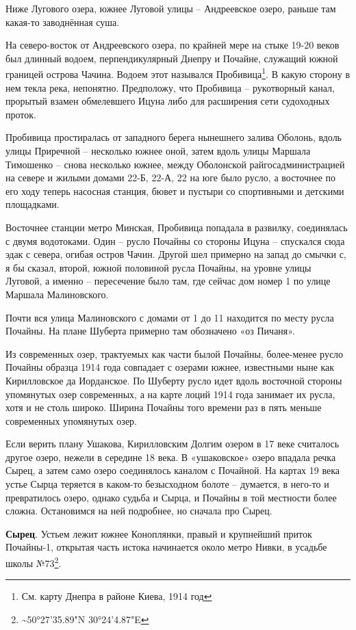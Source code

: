 Ниже Лугового озера, южнее Луговой улицы – 
Андреевское озеро, раньше там какая-то заводнённая суша. 

На северо-восток от Андреевского озера, по крайней мере на стыке 19-20 веков был длинный водоем, перпендикулярный Днепру и Почайне, служащий южной границей острова Чачина. Водоем этот назывался Пробивица\footnote{См. карту Днепра в районе Киева, 1914 год}. В какую сторону в нем текла река, непонятно. Предположу, что Пробивица – рукотворный канал, прорытый взамен обмелевшего Ицуна либо для расширения сети судоходных проток.

Пробивица простиралась от западного берега нынешнего залива Оболонь, вдоль улицы Приречной – несколько южнее оной, затем вдоль улицы Маршала Тимошенко – снова несколько южнее, между Оболонской райгосадминистрацией на севере и жилыми домами 22-Б, 22-А, 22 на юге было русло, а восточнее по его ходу теперь насосная станция, бювет и пустыри со спортивными и детскими площадками.

Восточнее станции метро Минская, Пробивица попадала в развилку, соединялась с двумя водотоками. Один – русло Почайны со стороны Ицуна – спускался сюда эдак с севера, огибая остров Чачин. Другой шел примерно на запад до смычки с, я бы сказал, второй, южной половиной русла Почайны, на уровне улицы Луговой, а именно – пересечение было там, где сейчас дом номер 1 по улице Маршала Малиновского.

Почти вся улица Малиновского с домами от 1 до 11 находится по месту русла Почайны. На плане Шуберта примерно там обозначено «оз Пичаня».

Из современных озер, трактуемых как части былой Почайны, более-менее русло Почайны образца 1914 года совпадает с озерами южнее, известными ныне как Кирилловское да Иорданское. По Шуберту русло идет вдоль восточной стороны упомянутых озер современных, а на карте лоций 1914 года занимает их русла, хотя и не столь широко. Ширина Почайны того времени раз в пять меньше современных упомянутых озер.

Если верить плану Ушакова, Кирилловским Долгим озером в 17 веке считалось другое озеро, нежели в середине 18 века. В «ушаковское» озеро впадала речка Сырец, а затем само озеро соединялось каналом с Почайной. На картах 19 века устье Сырца теряется в каком-то безысходном болоте – думается, в него-то и превратилось озеро, однако судьба и Сырца, и Почайны в той местности более сложна. Остановимся на ней подробнее, но сначала про Сырец.

\textbf{Сырец}. Устьем лежит южнее Коноплянки, правый и крупнейший приток Почайны-1, открытая часть истока начинается около метро Нивки, в усадьбе школы №73\footnote{\textasciitilde{}50°27'35.89"N  30°24'4.87"E}.

